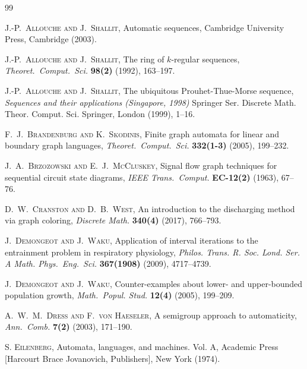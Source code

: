 \documentclass[12pt]{article}
\begin{document}
\begin{thebibliography}{99}

 \textsc{J.-P.\ Allouche and J.\ Shallit}, 
 Automatic sequences, 
 Cambridge University Press, Cambridge (2003). 
 
 \textsc{J.-P.\ Allouche and J.\ Shallit}, 
 The ring of {$k$}-regular sequences, 
 \emph{Theoret.\ Comput.\ Sci.} {\bf 98(2)} (1992), 163--197. 

 \textsc{J.-P.\ Allouche and J.\ Shallit}, 
 The ubiquitous {P}rouhet-{T}hue-{M}orse sequence, 
 \emph{Sequences and their applications ({S}ingapore, 1998)} Springer Ser. Discrete Math. Theor. Comput. Sci.
 Springer, London (1999), 1--16. 

 \textsc{F.\ J.\ Brandenburg and K.\ Skodinis}, 
 Finite graph automata for linear and boundary graph languages, 
 \emph{Theoret.\ Comput.\ Sci.} {\bf 332(1-3)} (2005), 199--232. 

 \textsc{J.\ A.\ Brzozowski and E.\ J.\ McCluskey}, 
 Signal flow graph techniques for sequential circuit state diagrams, 
 \emph{IEEE Trans.\ Comput.} {\bf EC-12(2)} (1963), 67--76. 

 \textsc{D.\ W.\ Cranston and D.\ B.\ West}, 
 An introduction to the discharging method via graph coloring, 
 \emph{Discrete Math.} {\bf 340(4)} (2017), 766--793. 

 \textsc{J.\ Demongeot and J.\ Waku}, 
 Application of interval iterations to the entrainment problem in respiratory physiology, 
 \emph{Philos. Trans. R. Soc. Lond. Ser. A Math. Phys.\ Eng.\ Sci.} {\bf 367(1908)} (2009), 4717--4739. 

 \textsc{J.\ Demongeot and J.\ Waku}, 
 Counter-examples about lower- and upper-bounded population growth, 
 \emph{Math.\ Popul. Stud.} {\bf 12(4)} (2005), 199--209. 

 \textsc{A.\ W.\ M.\ Dress and F.\ von Haeseler}, 
 A semigroup approach to automaticity, 
 \emph{Ann.\ Comb.} {\bf 7(2)} (2003), 171--190. 

 \textsc{S. Eilenberg}, 
 Automata, languages, and machines. {V}ol. {A}, 
 Academic Press [Harcourt Brace Jovanovich, Publishers], New York (1974). 


\end{thebibliography}
\end{document}
